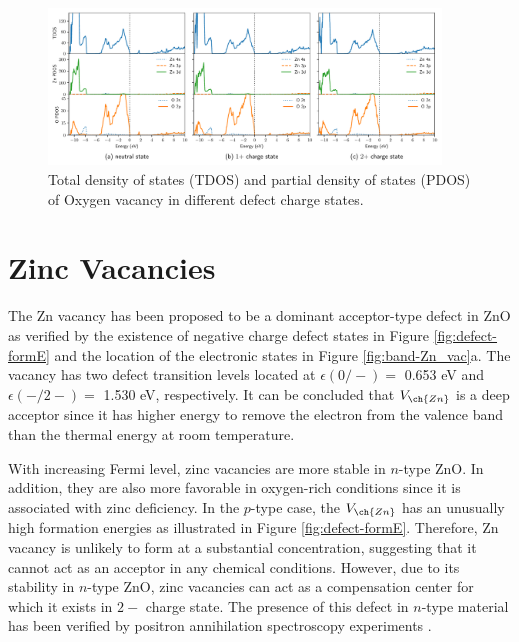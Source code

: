 \begin{figure}[tbph!]
	\centering
	\includegraphics[width=0.93\textwidth]{"images/rnd/O_vac-dos"}
	\caption[Total density of states (TDOS) and partial density of states (PDOS) of Oxygen vacancy in different  defect charge states]{Total density of states (TDOS) and partial density of states (PDOS) of Oxygen vacancy in different  defect charge states.}
	\label{fig:dos-O_vac}
\end{figure}


\section{Zinc Vacancies}
The Zn vacancy has been proposed to be a dominant acceptor-type defect in ZnO as verified by the existence of negative charge defect states in Figure \ref{fig:defect-formE} and the location of the electronic states in Figure \ref{fig:band-Zn_vac}a. The  vacancy has two defect transition levels located at
$\epsilon(0/-)=$ 0.653 eV and  $\epsilon(-/2-)=$ 1.530 eV, respectively. It can be concluded that $V_{\ch{Zn}}$  is a deep acceptor since it has higher energy to remove the electron from the valence band than the thermal energy at room temperature.

With increasing Fermi level, zinc vacancies are more stable  in $n$-type ZnO. In addition, they are also more favorable in oxygen-rich conditions since it is associated with zinc deficiency. In the $p$-type case, the $V_{\ch{Zn}}$ has an unusually high formation energies as illustrated in Figure \ref{fig:defect-formE}. Therefore,  Zn vacancy is unlikely to form at a substantial concentration, suggesting that it cannot act as an acceptor in any chemical conditions. However, due to its stability in $n$-type ZnO, zinc vacancies can act as a compensation center for which it exists in $2-$ charge state. The presence of this defect in $n$-type material has been verified by positron annihilation spectroscopy experiments \citep{Tuomisto2003,Tuomisto2005}.

